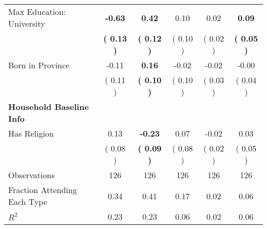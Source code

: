 \begin{table}[H]
{\begin{tabular}{lccccc}
\quad Max Education: University & \textbf{    -0.63} & \textbf{     0.42} &      0.10 &      0.02 & \textbf{     0.09} \\
\quad  & \textbf{(     0.13 )} & \textbf{(     0.12 )}  & (     0.10 )  & (     0.02 ) & \textbf{(     0.05 )} \\
\quad Born in Province &     -0.11 & \textbf{     0.16} &     -0.02 &     -0.02 &     -0.00 \\
\quad  & (     0.11 ) & \textbf{(     0.10 )}  & (     0.10 )  & (     0.03 ) & (     0.04 ) \\
\midrule
\textbf{Household Baseline Info} \\
\quad Has Religion &      0.13 & \textbf{    -0.23} &      0.07 &     -0.02 &      0.03 \\
\quad  & (     0.08 ) & \textbf{(     0.09 )}  & (     0.08 )  & (     0.02 ) & (     0.05 ) \\
\midrule
Observations & 126 & 126 & 126 & 126 & 126 \\
Fraction Attending Each Type &      0.34 &      0.41 &      0.17 &      0.02 &      0.06 \\
\midrule
$ R^2$ &      0.23 &      0.23 &      0.06 &      0.02 &      0.06 \\
\bottomrule
\end{tabular}}
\end{table}
